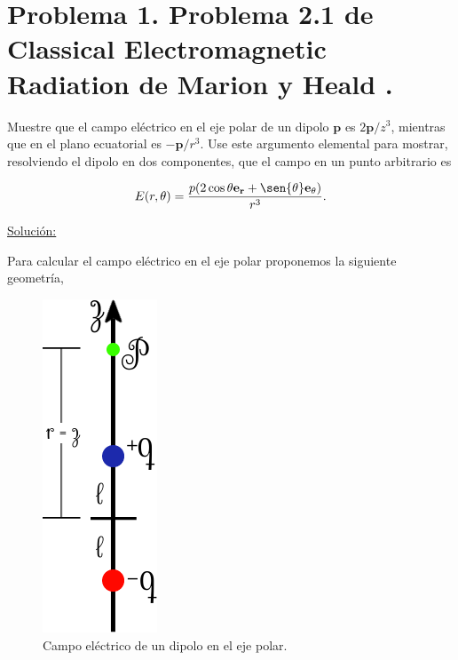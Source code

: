 \documentclass[a4paper,11pt]{article}
\numberwithin{equation}{section}
\renewcommand{\thefootnote}{\fnsymbol{footnote}}
\begin{document}

\fancyhead[R]{\thepage}

\setcounter{footnote}{0}
\renewcommand*{\thefootnote}{\arabic{footnote}}

\section{Problema 1. Problema 2.1 de Classical Electromagnetic Radiation
de Marion y Heald \cite{marion2}.}

Muestre que el campo eléctrico en el eje polar de un dipolo $\mathbf{p}$ es 
$2\mathbf{p}/z^3$, mientras que en el plano ecuatorial es $-\mathbf{p}/r^3$. Use 
este argumento elemental para mostrar, resolviendo el dipolo en dos componentes, que 
el campo en un punto arbitrario es 

$$
E(r,\theta) = \frac{p(2\cos{\theta}\mathbf{e_r} + \sen{\theta}\mathbf{e_\theta})}{r^3}.
$$

\vspace{.3cm}

\underline{Solución:} \vspace{.3cm}

Para calcular el campo eléctrico en el eje polar proponemos la siguiente geometría,

\begin{figure}[H]
 \center 
 \includegraphics[scale=0.5]{problema1fig1}
 \caption{Campo eléctrico de un dipolo en el eje polar.}
 \label{fig:problema1fig1}
\end{figure}
\end{document}
